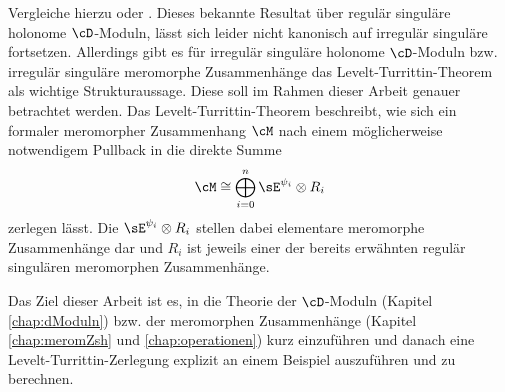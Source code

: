   \begin{center}
  \end{center}
\fi
Vergleiche hierzu \cite[Sec 6]{REFKashiwara1984} oder \cite[Thm
7.2.1]{hotta2007d}.
Dieses bekannte Resultat über regulär singuläre holonome $\cD$-Moduln,
lässt sich leider nicht kanonisch auf irregulär singuläre fortsetzen.
Allerdings gibt es für irregulär singuläre holonome $\cD$-Moduln bzw. irregulär
singuläre meromorphe Zusammenhänge das Levelt-Turrittin-Theorem als wichtige
Strukturaussage. 
Diese soll im Rahmen dieser Arbeit genauer betrachtet werden.
Das Levelt-Turrittin-Theorem beschreibt, wie sich ein formaler meromorpher
Zusammenhang $\cM$ nach einem möglicherweise notwendigem Pullback in die
direkte Summe
\[
\cM \cong \bigoplus_{i=0}^n \sE^{\psi_i}\otimes R_i
\]
zerlegen lässt.
Die $\sE^{\psi_i}\otimes R_i$ stellen dabei elementare meromorphe Zusammenhänge
dar und $R_i$ ist jeweils einer der bereits erwähnten regulär singulären
meromorphen Zusammenhänge.

Das Ziel dieser Arbeit ist es, in die Theorie der $\cD$-Moduln (Kapitel
\ref{chap:dModuln}) bzw. der meromorphen Zusammenhänge (Kapitel
\ref{chap:meromZsh} und \ref{chap:operationen}) kurz einzuführen und danach
eine Levelt-Turrittin-Zerlegung explizit an einem Beispiel auszuführen und zu
berechnen.
\begin{comment}
Die Riemann-Hilbert-Korrespondenz und die Theorie der Stokes-Strukturen werden
in dieser Arbeit nicht weiter betrachtet.
\end{comment}

\begin{comment}
Es wird in dieser Arbeit kein Vorwissen über $\cD$-Moduln bzw. meromorphe
Zusammenhänge vorausgesetzt, diese beiden Begriffe werden in den ersten Zwei
Kapiteln eingeführt.
\end{comment}

